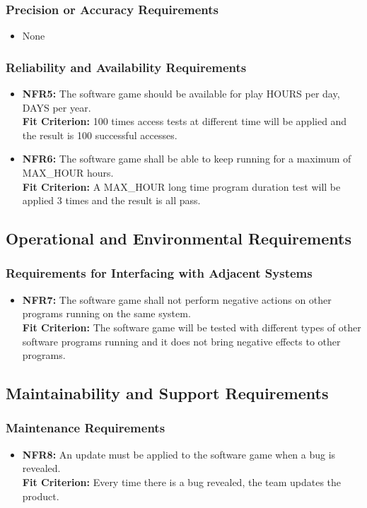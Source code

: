 \documentclass[12pt, titlepage]{article}
\begin{document}
\subsubsection{Precision or Accuracy Requirements}
\begin{itemize}
        \item None
\end{itemize}
\subsubsection{Reliability and Availability Requirements}
\begin{itemize}
        \item \textbf{NFR5:} The software game should be available for play HOURS per day, DAYS per year.\\
                    \textbf{Fit Criterion:} 100 times access tests at different time will be applied and the result is 100 successful accesses.
        \item \textbf{NFR6:} The software game shall be able to keep running for a maximum of MAX\_HOUR hours.\\
                    \textbf{Fit Criterion:} A MAX\_HOUR long time program duration test will be applied 3 times and the result is all pass.
\end{itemize}
\subsection{Operational and Environmental Requirements}
\subsubsection{Requirements for Interfacing with Adjacent Systems}
\begin{itemize}
        \item \textbf{NFR7:} The software game shall not perform negative actions on other programs running on the same system.\\
                    \textbf{Fit Criterion:} The software game will be tested with different types of other software programs running and it does not bring negative effects to other programs.
\end{itemize}
\subsection{Maintainability and Support Requirements}
\subsubsection{Maintenance Requirements}
\begin{itemize}
        \item \textbf{NFR8:} An update must be applied to the software game when a bug is revealed.\\
                    \textbf{Fit Criterion:} Every time there is a bug revealed, the team updates the product.
\end{itemize}
\end{document}
